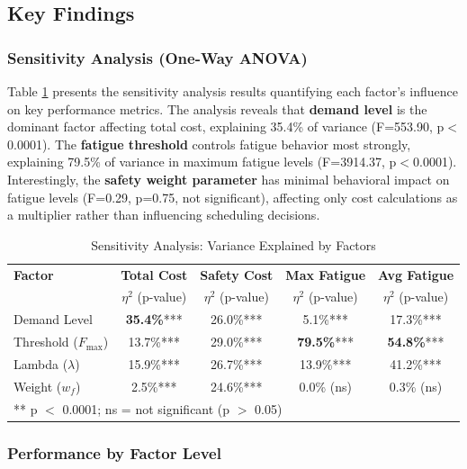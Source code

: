 \documentclass[11pt,letterpaper]{article}
\begin{document}
\subsection{Key Findings}

\subsubsection{Sensitivity Analysis (One-Way ANOVA)}
Table \ref{tab:sensitivity} presents the sensitivity analysis results quantifying each factor's influence on key performance metrics. The analysis reveals that \textbf{demand level} is the dominant factor affecting total cost, explaining 35.4\% of variance (F=553.90, p$<$0.0001). The \textbf{fatigue threshold} controls fatigue behavior most strongly, explaining 79.5\% of variance in maximum fatigue levels (F=3914.37, p$<$0.0001). Interestingly, the \textbf{safety weight parameter} has minimal behavioral impact on fatigue levels (F=0.29, p=0.75, not significant), affecting only cost calculations as a multiplier rather than influencing scheduling decisions.

\begin{table}[h]
\centering
\caption{Sensitivity Analysis: Variance Explained by Factors}
\label{tab:sensitivity}
\small
\begin{tabular}{@{}lcccc@{}}
\toprule
\textbf{Factor} & \textbf{Total Cost} & \textbf{Safety Cost} & \textbf{Max Fatigue} & \textbf{Avg Fatigue} \\
 & $\eta^2$ (p-value) & $\eta^2$ (p-value) & $\eta^2$ (p-value) & $\eta^2$ (p-value) \\
\midrule
Demand Level & \textbf{35.4\%}*** & 26.0\%*** & 5.1\%*** & 17.3\%*** \\
Threshold ($F_{\max}$) & 13.7\%*** & 29.0\%*** & \textbf{79.5\%}*** & \textbf{54.8\%}*** \\
Lambda ($\lambda$) & 15.9\%*** & 26.7\%*** & 13.9\%*** & 41.2\%*** \\
Weight ($w_f$) & 2.5\%*** & 24.6\%*** & 0.0\% (ns) & 0.3\% (ns) \\
\bottomrule
\multicolumn{5}{l}{\small *** p $<$ 0.0001; ns = not significant (p $>$ 0.05)}
\end{tabular}
\end{table}

\subsubsection{Performance by Factor Level}
\end{document}
